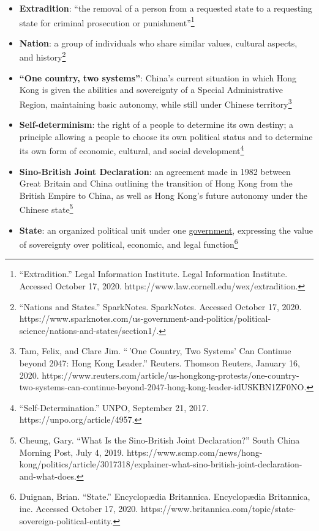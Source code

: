 \documentclass[10pt, letterpaper]{article}
\begin{document}
\begin{itemize}
    \item 
\textbf{Extradition}: ``the removal of a person from a requested state
to a requesting state for criminal prosecution or
punishment''\footnote{``Extradition.'' Legal Information Institute.
  Legal Information Institute. Accessed October 17, 2020.
  https://www.law.cornell.edu/wex/extradition.}
    \item 

\textbf{Nation}: a group of individuals who share similar values,
cultural aspects, and history\footnote{``Nations and States.''
  SparkNotes. SparkNotes. Accessed October 17, 2020.
  https://www.sparknotes.com/us-government-and-politics/political-science/nations-and-states/section1/.}
    \item 

\textbf{``One country, two systems''}: China's current situation in
which Hong Kong is given the abilities and sovereignty of a Special
Administrative Region, maintaining basic autonomy, while still under
Chinese territory\footnote{Tam, Felix, and Clare Jim. ``\,'One Country,
  Two Systems' Can Continue beyond 2047: Hong Kong Leader.'' Reuters.
  Thomson Reuters, January 16, 2020.
  https://www.reuters.com/article/us-hongkong-protests/one-country-two-systems-can-continue-beyond-2047-hong-kong-leader-idUSKBN1ZF0NO.}
    \item 

\textbf{Self-determinism}: the right of a people to determine its own
destiny; a principle allowing a people to choose its own political
status and to determine its own form of economic, cultural, and social
development\footnote{``Self-Determination.'' UNPO, September 21, 2017.
  https://unpo.org/article/4957.}
    \item 

\textbf{Sino-British Joint Declaration}: an agreement made in 1982
between Great Britain and China outlining the transition of Hong Kong
from the British Empire to China, as well as Hong Kong's future autonomy
under the Chinese state\footnote{Cheung, Gary. ``What Is the
  Sino-British Joint Declaration?'' South China Morning Post, July 4,
  2019.
  https://www.scmp.com/news/hong-kong/politics/article/3017318/explainer-what-sino-british-joint-declaration-and-what-does.}
    \item 

\textbf{State}: an organized political unit under one
\href{https://en.wikipedia.org/wiki/Government}{government}, expressing
the value of sovereignty over political, economic, and legal
function\footnote{Duignan, Brian. ``State.'' Encyclopædia Britannica.
  Encyclopædia Britannica, inc. Accessed October 17, 2020.
  https://www.britannica.com/topic/state-sovereign-political-entity.}
\end{itemize}
\end{document}
